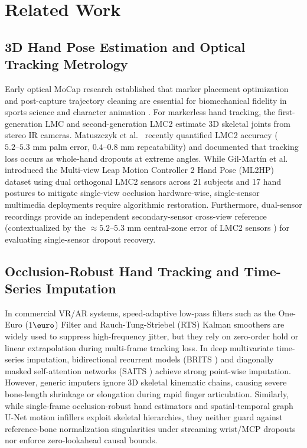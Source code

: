 \documentclass[10pt,twocolumn]{article}
\begin{document}
\section{Related Work}

\subsection{3D Hand Pose Estimation and Optical Tracking Metrology}
Early optical MoCap research established that marker placement optimization and post-capture trajectory cleaning are essential for biomechanical fidelity in sports science and character animation \cite{bregler2007motion,tirakoat2011optimized,noiumkar2013use}. For markerless hand tracking, the first-generation LMC \cite{marin2016hand,boulahia2017dynamic} and second-generation LMC2 \cite{gilmartin2024dual,matuszczyk2025comparative} estimate 3D skeletal joints from stereo IR cameras. Matuszczyk et al.\ \cite{matuszczyk2025comparative} recently quantified LMC2 accuracy ($5.2\text{--}5.3\text{ mm}$ palm error, $0.4\text{--}0.8\text{ mm}$ repeatability) and documented that tracking loss occurs as whole-hand dropouts at extreme angles. While Gil-Mart\'{i}n et al.\ \cite{gilmartin2024dual} introduced the Multi-view Leap Motion Controller 2 Hand Pose (ML2HP) dataset using dual orthogonal LMC2 sensors across 21 subjects and 17 hand postures to mitigate single-view occlusion hardware-wise, single-sensor multimedia deployments require algorithmic restoration. Furthermore, dual-sensor recordings provide an independent secondary-sensor cross-view reference (contextualized by the $\approx 5.2\text{--}5.3\text{ mm}$ central-zone error of LMC2 sensors \cite{matuszczyk2025comparative}) for evaluating single-sensor dropout recovery.

\subsection{Occlusion-Robust Hand Tracking and Time-Series Imputation}
In commercial VR/AR systems, speed-adaptive low-pass filters such as the One-Euro ($1\text{\euro}$) Filter \cite{casiez20121euro} and Rauch-Tung-Striebel (RTS) Kalman smoothers are widely used to suppress high-frequency jitter, but they rely on zero-order hold or linear extrapolation during multi-frame tracking loss. In deep multivariate time-series imputation, bidirectional recurrent models (BRITS \cite{cao2018brits}) and diagonally masked self-attention networks (SAITS \cite{du2023saits}) achieve strong point-wise imputation. However, generic imputers ignore 3D skeletal kinematic chains, causing severe bone-length shrinkage or elongation during rapid finger articulation. Similarly, while single-frame occlusion-robust hand estimators and spatial-temporal graph U-Net motion infillers exploit skeletal hierarchies, they neither guard against reference-bone normalization singularities under streaming wrist/MCP dropouts nor enforce zero-lookahead causal bounds.
\end{document}
